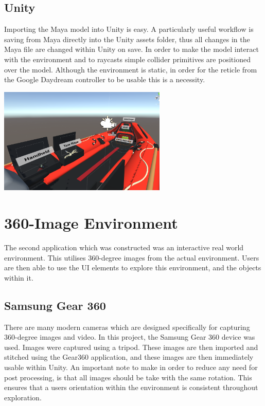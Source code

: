 \documentclass[a4paper, openright, twoside]{book}
\begin{document}
\begin{minipage}{\textwidth}
\begin{center}
\begin{minipage}{0.18\textwidth}
    \end{minipage}\hfill
\end{center}
\end{minipage}

\subsection{Unity}
Importing the Maya model into Unity is easy. A particularly useful workflow is saving from Maya directly into the Unity assets folder, thus all changes in the Maya file are changed within Unity on save. In order to make the model interact with the environment and to raycasts simple collider primitives are positioned over the model. Although the environment is static, in order for the reticle from the Google Daydream controller to be usable this is a necessity.  

\begin{minipage}{\textwidth}
\hfill \break
\centering
\includegraphics[width=0.6\textwidth]{images/model_unity}
\label{model}
\hfill \break
\end{minipage}

\section{360-Image Environment}
The second application which was constructed was an interactive real world environment. This utilises 360-degree images from the actual environment. Users are then able to use the UI elements to explore this environment, and the objects within it. 

\subsection{Samsung Gear 360}
There are many modern cameras which are designed specifically for capturing 360-degree images and video. In this project, the Samsung Gear 360 device was used. Images were captured using a tripod. These images are then imported and stitched using the Gear360 application, and these images are then immediately usable within Unity. An important note to make in order to reduce any need for post processing, is that all images should be take with the same rotation. This ensures that a users orientation within the environment is consistent throughout exploration. 
\end{document}
